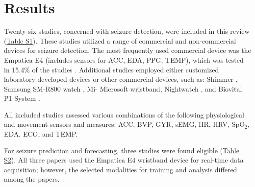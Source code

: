 \section{Results}

Twenty-six studies, concerned with seizure detection, were included in this review (\href{https://docs.google.com/spreadsheets/d/1FjxwkHFbNDM84nuqg513gR_0vIVql-evoT1EMiqSYZU/edit?pli=1&gid=1255223968#gid=1255223968}{Table S1}). These studies utilized a range of commercial and non-commercial devices for seizure detection. The most frequently used commercial device was the Empatica E4 (includes sensors for ACC, EDA, PPG, TEMP), which was tested in 15.4\% of the studies \cite{Yu2023-ss, Regalia2019-ch,Nasseri2021-xn, Tang2021-td}. Additional studies employed either customized laboratory-developed devices or other commercial devices, such as: Shimmer \cite{Van_Andel2017-yx, Gheryani2017-yg}, Samsung SM-R800 watch \cite{Vakilna2024-hk}, Mi- Microsoft wristband\cite{Jiang2022-zu}, Nightwatch \cite{Arends2018-ew}, and Biovital P1 System \cite{Wu2024-yl, Wang2025-ql}.

All included studies assessed various combinations of the following physiological and movement sensors and measures: ACC, BVP, GYR, sEMG, HR, HRV, SpO$_2$, EDA, ECG, and TEMP.

For seizure prediction and forecasting, three studies were found eligible \cite{Vieluf2023-ta,Vieluf2023-zv,Meisel2020-ii} (\href{https://docs.google.com/spreadsheets/d/1FjxwkHFbNDM84nuqg513gR_0vIVql-evoT1EMiqSYZU/edit?pli=1&gid=97270185#gid=97270185}{Table S2}). All three papers used the Empatica E4 wristband device for real-time data acquisition; however, the selected modalities for training and analysis differed among the papers.







